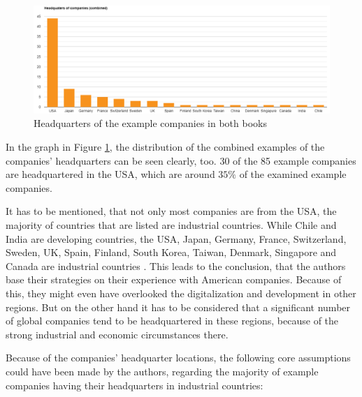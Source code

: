 \documentclass[a4]{scrartcl}
\begin{document}
\begin{figure}[H]
	\centering
	\includegraphics[width=1\textwidth]{images/combi_graph.png}
	\caption{Headquarters of the example companies in both books \cite{digitalmatrix, leadingdigital}}
	\label{fig:C_graph}
\end{figure}

In the graph in Figure \ref{fig:C_graph}, the distribution of the combined examples of the companies' headquarters can be seen clearly, too. 30 of the 85 example companies are headquartered in the USA, which are around $35\%$ of the examined example companies.

It has to be mentioned, that not only most companies are from the USA, the majority of countries that are listed are industrial countries. 
While Chile and India are developing countries, the USA, Japan, Germany, France, Switzerland, Sweden, UK, Spain, Finland, South Korea, Taiwan, Denmark, Singapore and Canada are industrial countries \cite{UN}.
This leads to the conclusion, that the authors base their strategies on their experience with American companies. Because of this, they might even have overlooked the digitalization and development in other regions. But on the other hand it has to be considered that a significant number of global companies tend to be headquartered in these regions, because of the strong industrial and economic circumstances there. \cite{basis1, basis2}

Because of the companies' headquarter locations, the following core assumptions could have been made by the authors, regarding the majority of example companies having their headquarters in industrial countries:
\end{document}
